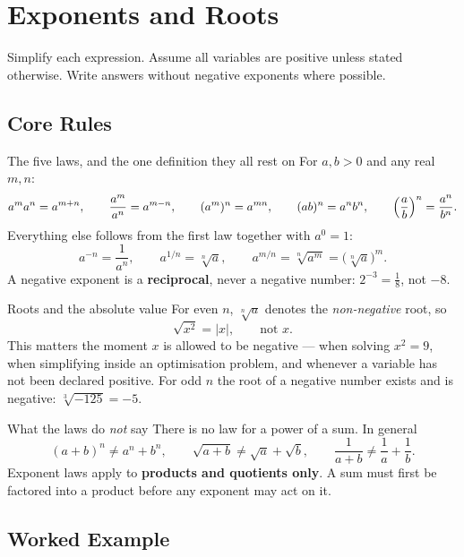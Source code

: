 \chapter{Exponents and Roots}

Simplify each expression. Assume all variables are positive unless stated
otherwise. Write answers without negative exponents where possible.

\section{Core Rules}

\begin{rulebox}{The five laws, and the one definition they all rest on}
For $a,b>0$ and any real $m,n$:
\[
  a^{m}a^{n}=a^{m+n},\qquad
  \frac{a^{m}}{a^{n}}=a^{m-n},\qquad
  (a^{m})^{n}=a^{mn},\qquad
  (ab)^{n}=a^{n}b^{n},\qquad
  \Bigl(\frac{a}{b}\Bigr)^{n}=\frac{a^{n}}{b^{n}} .
\]
Everything else follows from the first law together with $a^{0}=1$:
\[
  a^{-n}=\frac{1}{a^{n}},\qquad
  a^{1/n}=\sqrt[n]{a},\qquad
  a^{m/n}=\sqrt[n]{a^{m}}=\bigl(\sqrt[n]{a}\bigr)^{m} .
\]
A negative exponent is a \textbf{reciprocal}, never a negative number:
$2^{-3}=\tfrac18$, not $-8$.
\end{rulebox}

\begin{rulebox}{Roots and the absolute value}
For even $n$, $\sqrt[n]{a}$ denotes the \emph{non-negative} root, so
\[
  \sqrt{x^{2}}=|x|,\qquad\text{not } x .
\]
This matters the moment $x$ is allowed to be negative --- when solving
$x^{2}=9$, when simplifying inside an optimisation problem, and whenever a
variable has not been declared positive. For odd $n$ the root of a negative
number exists and is negative: $\sqrt[3]{-125}=-5$.
\end{rulebox}

\begin{rulebox}{What the laws do \emph{not} say}
There is no law for a power of a sum. In general
\[
  (a+b)^{n}\neq a^{n}+b^{n},\qquad
  \sqrt{a+b}\neq\sqrt{a}+\sqrt{b},\qquad
  \frac{1}{a+b}\neq\frac1a+\frac1b .
\]
Exponent laws apply to \textbf{products and quotients only}. A sum must
first be factored into a product before any exponent may act on it.
\end{rulebox}

\section{Worked Example}

